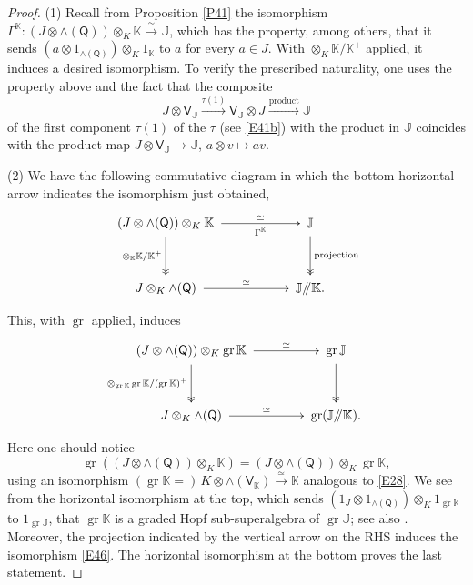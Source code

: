 \documentclass[11pt, a4paper]{amsart}
\theoremstyle{definition}
\numberwithin{equation}{section}
\begin{document}
\begin{proof}
(1) Recall from Proposition \ref{P41} the isomorphism $\Gamma^{\mathbb{K}}: (J \otimes \wedge(\mathsf{Q})) \otimes_{K} \mathbb{K} \overset{\simeq}{\longrightarrow} \mathbb{J}$, which has the property, among others, that it sends $(a \otimes 1_{\wedge(\mathsf{Q})}) \otimes_{K} 1_{\mathbb{K}}$ to $a$ for every $a \in J$.
With $\otimes_{K} \mathbb{K}/\mathbb{K}^{+}$ applied, it induces a desired isomorphism.
To verify the prescribed naturality, one uses the property above and the fact that the composite 
\[
J \otimes \mathsf{V}_{\mathbb{J}} \xrightarrow{\tau(1)} \mathsf{V}_{\mathbb{J}}\otimes J 
\xrightarrow{\mathrm{product}}\mathbb{J}
\]
of the first component $\tau(1)$ of the $\tau$ (see \eqref{E41b}) with the product in $\mathbb{J}$ coincides with the product map
$J \otimes \mathsf{V}_{\mathbb{J}}\to \mathbb{J}$, $a \otimes v\mapsto av$. 

(2) We have the following commutative diagram in which the bottom horizontal arrow indicates the isomorphism just obtained,
\[
\begin{xy}
(0,0)   *++{(J \otimes \wedge(\mathsf{Q})) \otimes_K \mathbb{K}}  ="1",
(40,0)  *++{\mathbb{J}}    ="2",
(0,-18) *++{J \otimes_K \wedge(\mathsf{Q})} ="3",
(40,-18)*++{\mathbb{J} /\hspace{-1mm}/\mathbb{K}.} ="4",
{"1" \SelectTips{cm}{} \ar @{->}_-{\Gamma^{\mathbb{K}}}^-{\simeq} "2"},
{"1" \SelectTips{cm}{} \ar @{->>}_{\otimes_{\mathbb{K}} \mathbb{K}/\mathbb{K}^{+}} "3"},
{"2" \SelectTips{cm}{} \ar @{->>}^-{\mathrm{projection}} "4"},
{"3" \SelectTips{cm}{} \ar @{->}^-{\simeq} "4"},
\end{xy}
\]
This, with $\operatorname{gr}$ applied, induces
\[
\begin{xy}
(0,0)   *++{(J \otimes \wedge(\mathsf{Q})) \otimes_K\operatorname{gr}\mathbb{K}}  ="1",
(40,0)  *++{\operatorname{gr}\mathbb{J}}    ="2",
(0,-18) *++{J \otimes_K \wedge(\mathsf{Q})} ="3",
(40,-18)*++{\operatorname{gr}(\mathbb{J} /\hspace{-1mm}/\mathbb{K}).} ="4",
{"1" \SelectTips{cm}{} \ar @{->}^-{\simeq} "2"},
{"1" \SelectTips{cm}{} \ar @{->>}_-{\otimes_{\operatorname{gr}\mathbb{K}} \operatorname{gr}\mathbb{K}/(\operatorname{gr}\mathbb{K})^{+}} "3"},
{"2" \SelectTips{cm}{} \ar @{->>} "4"},
{"3" \SelectTips{cm}{} \ar @{->}^-{\simeq} "4"},
\end{xy}
\]
Here one should notice 
\[ \operatorname{gr}((J \otimes \wedge(\mathsf{Q})) \otimes_{K} \mathbb{K}) = (J \otimes \wedge(\mathsf{Q})) \otimes_{K} \operatorname{gr}\mathbb{K}, \]
using an isomorphism $(\operatorname{gr}\mathbb{K} =)\, K \otimes \wedge(\mathsf{V}_{\mathbb{K}}) \overset{\simeq}{\longrightarrow} \mathbb{K}$ analogous to \eqref{E28}.
We see from the horizontal isomorphism at the top, which sends $(1_{J} \otimes 1_{\wedge(\mathsf{Q})}) \otimes_{K} 1_{\operatorname{gr}\mathbb{K}}$ to $1_{\operatorname{gr}\mathbb{J}}$, that $\operatorname{gr}\mathbb{K}$ is a graded Hopf sub-superalgebra of $\operatorname{gr}\mathbb{J}$; see also \cite[Remark 3.8]{M2}.
Moreover, the projection indicated by the vertical arrow on the RHS induces the isomorphism \eqref{E46}.
The horizontal isomorphism at the bottom proves the last statement.
\end{proof}
\end{document}

